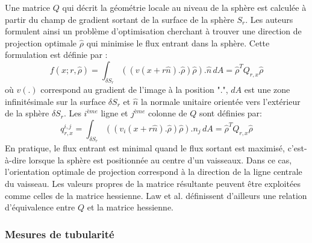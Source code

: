   Une matrice $Q$ qui décrit la géométrie locale au niveau de la sphère est calculée à partir du champ de gradient sortant de la surface de la sphère $S_r$. Les auteurs formulent ainsi un problème d'optimisation cherchant à trouver une direction de projection optimale  $\widehat{\rho}$ qui minimise le flux entrant dans la sphère. Cette formulation est définie par :
\begin{equation}
    f(x;r, \widehat{\rho} )= \int_{\delta S_r} (( v(x + r\widehat{n}).\widehat{\rho})\widehat{\rho}). \widehat{n}\,dA = \widehat{\rho}^{T}Q_{r,x}\widehat{\rho}  	\nonumber
\end{equation}
où $v(.)$ correspond au gradient de l'image à la position ".", $dA$ est une zone infinitésimale sur la surface $\delta S_r$ et $\widehat{n}$ la normale unitaire orientée vers l'extérieur de la sphère $\delta S_r$.
Les $i^{ème}$ ligne et $j^{ème}$ colonne de $Q$ sont définies par: 
\begin{equation}
    q_{r,x}^{i,j} = \int_{\delta S_r} (( v_i(x + r\widehat{n}).\widehat{\rho})\widehat{\rho}).n_j\,dA = \widehat{\rho}^{T}Q_{r,x}\widehat{\rho}  \nonumber	
\end{equation}
En pratique, le flux entrant est minimal quand le flux sortant est maximisé, c'est-à-dire lorsque la sphère est positionnée au centre d'un vaisseaux. Dans ce cas, l'orientation optimale de projection correspond à la direction de la ligne centrale du vaisseau. Les valeurs propres de la matrice résultante peuvent être exploitées comme celles de la matrice hessienne. Law et al. \cite{Law2008_OOF} définissent d'ailleurs une relation d'équivalence entre $Q$ et la matrice hessienne.


\subsubsection{Mesures de tubularité}
\label{sec:mesure_tubularity}

